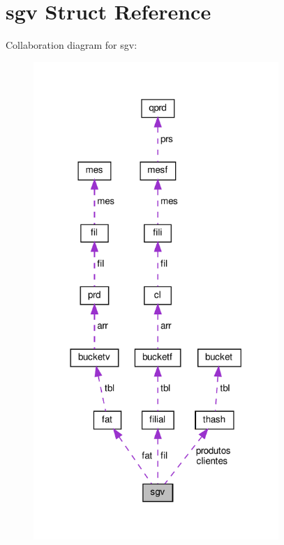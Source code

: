 \hypertarget{structsgv}{}\section{sgv Struct Reference}
\label{structsgv}


Collaboration diagram for sgv\+:
\nopagebreak
\begin{figure}[H]
\begin{center}
\leavevmode
\includegraphics[width=263pt]{structsgv__coll__graph}
\end{center}
\end{figure}
